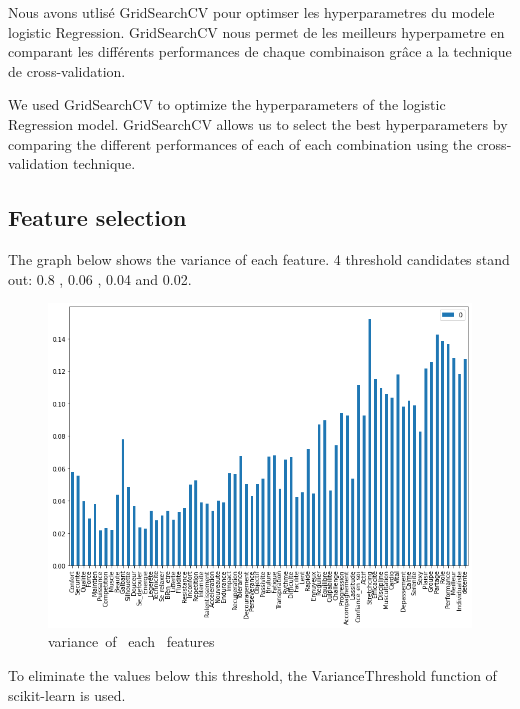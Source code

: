 \documentclass[12pt]{article}
\begin{document}
\vspace{0.2 cm}

Nous avons utlisé  GridSearchCV pour optimser les hyperparametres du modele  logistic Regression. 
GridSearchCV nous permet de les meilleurs hyperpametre en comparant les différents performances 
 de chaque combinaison grâce a la technique de cross-validation.
 
\vspace{0.2 cm}

We used GridSearchCV to optimize the hyperparameters of the logistic Regression model. 
GridSearchCV allows us to select the best hyperparameters by comparing the different performances of each 
 of each combination using the cross-validation technique.

  
\subsection{Feature selection} 

The graph below shows the variance of each feature. 
 4 threshold candidates stand out: 0.8 , 0.06 , 0.04 and 0.02.



\begin{figure}[H]
\begin{center}
\includegraphics[scale=0.6]{barlot.png}
\caption[]{ variance\ of \ each \ features}
\end{center}
\end{figure}

To eliminate the values below this threshold, the VarianceThreshold function of scikit-learn is used.
\end{document}
